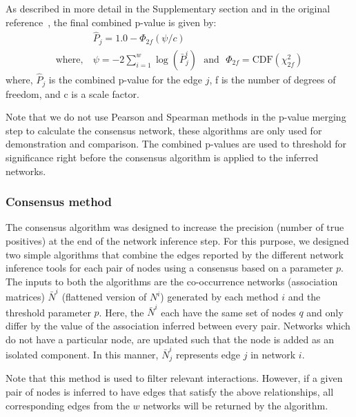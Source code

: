   As described in more detail in the Supplementary section and in the original reference~\cite{Poole_Gibbs_Shmulevich_Bernard_Knijnenburg_2016}, the final combined p-value is given by:
  \begin{equation}
    \begin{aligned}
        & \hat{P}_j = 1.0 - \Phi_{2f}\left( \psi / c \right) \\
        \text{where},~ &\psi = -2 \sum_{i=1}^w \log(\bar{P}^i_j) ~~~\text{and}~~~ \Phi_{2f} = \mathrm{CDF}\left( \chi^2_{2f} \right)
    \end{aligned}
    \label{eqn:pvalue-combined}
  \end{equation}
  where, $\hat{P}_j$ is the combined p-value for the edge $j$, f is the number of degrees of freedom, and c is a scale factor.

  Note that we do not use Pearson and Spearman methods in the p-value merging step to calculate the consensus network, these algorithms are only used for demonstration and comparison.
  The combined p-values are used to threshold for significance right before the consensus algorithm is applied to the inferred networks.

  \subsubsection*{Consensus method}
  \vspace{-5mm}

  The consensus algorithm was designed to increase the precision (number of true positives) at the end of the network inference step.
  For this purpose, we designed two simple algorithms that combine the edges reported by the different network inference tools for each pair of nodes using a consensus based on a parameter $p$.
  The inputs to both the algorithms are the co-occurrence networks (association matrices) $\bar{N}^i$ (flattened version of $N^{i}$) generated by each method $i$ and the threshold parameter $p$.
  Here, the $\bar{N}^{i}$ each have the same set of nodes $q$ and only differ by the value of the association inferred between every pair.
  Networks which do not have a particular node, are updated such that the node is added as an isolated component.
  In this manner, $\bar{N}^{i}_j$ represents edge $j$ in network $i$.

    Note that this method is used to filter relevant interactions. However, if a given pair of nodes is inferred to have edges that satisfy the above relationships, all corresponding edges from the $w$ networks will be returned by the algorithm.

